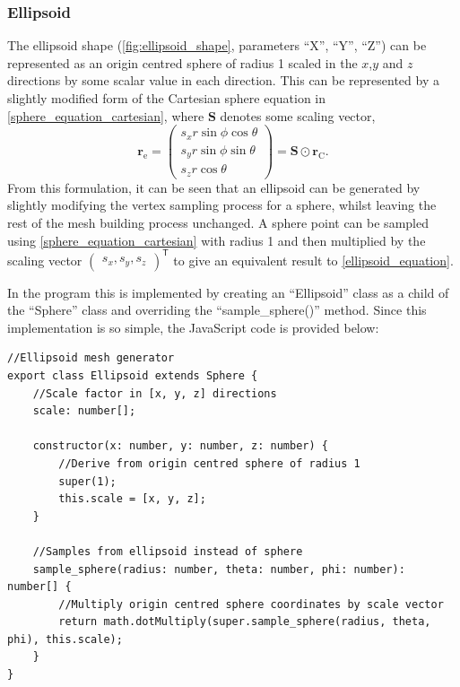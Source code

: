 \subsubsection{Ellipsoid}
The ellipsoid shape (\cref{fig:ellipsoid_shape}, parameters ``X'', ``Y'', ``Z'') can be represented as an origin centred sphere of radius 1 scaled in the $x$,$y$ and $z$ directions by some scalar value in each direction. This can be represented by a slightly modified form of the Cartesian sphere equation in \cref{sphere_equation_cartesian}, where $\mathbf{S}$ denotes some scaling vector,
\begin{equation}
\mathbf{r}_\mathrm{e}=\begin{pmatrix}s_x r\sin\phi \cos\theta\\
s_y r\sin\phi \sin\theta\\
s_z r\cos\theta\end{pmatrix}
=\mathbf{S} \odot \mathbf{r}_\mathrm{C}.
\label{ellipsoid_equation}
\end{equation}
From this formulation, it can be seen that an ellipsoid can be generated by slightly modifying the vertex sampling process for a sphere, whilst leaving the rest of the mesh building process unchanged. A sphere point can be sampled using \cref{sphere_equation_cartesian} with radius 1 and then multiplied by the scaling vector $\begin{pmatrix}s_x,s_y,s_z\end{pmatrix}^\mathsf{T}$ to give an equivalent result to \cref{ellipsoid_equation}.

In the program this is implemented by creating an ``Ellipsoid'' class as a child of the ``Sphere'' class and overriding the ``sample\_sphere()'' method. Since this implementation is so simple, the JavaScript code is provided below:

\begin{adjustbox}{width=\textwidth}
\begin{lstlisting}
//Ellipsoid mesh generator
export class Ellipsoid extends Sphere {
    //Scale factor in [x, y, z] directions
    scale: number[];

    constructor(x: number, y: number, z: number) {
        //Derive from origin centred sphere of radius 1
        super(1);
        this.scale = [x, y, z];
    }

    //Samples from ellipsoid instead of sphere
    sample_sphere(radius: number, theta: number, phi: number): number[] {
        //Multiply origin centred sphere coordinates by scale vector
        return math.dotMultiply(super.sample_sphere(radius, theta, phi), this.scale);
    }
}
\end{lstlisting}
\end{adjustbox}

